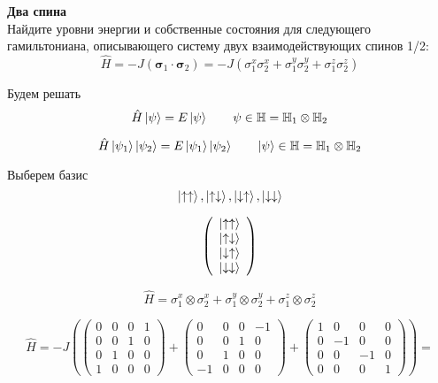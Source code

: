 \newpage

\begin{problem}{\textbf{Два спина}}
	\\
	Найдите уровни энергии и собственные состояния для следующего гамильтониана, описывающего систему двух взаимодействующих спинов 1/2:
	$$
	\hat{H}=-J\left(\boldsymbol{\sigma}_{1} \cdot \boldsymbol{\sigma}_{2}\right)=-J\left(\sigma_{1}^{x} \sigma_{2}^{x}+\sigma_{1}^{y} \sigma_{2}^{y}+\sigma_{1}^{z} \sigma_{2}^{z}\right)
	$$
	
\end{problem}	

\begin{solution}
 Будем решать $$ \hat{H}\ket{\psi}=E\ket{\psi } \qquad \psi \in \mathbb{H}=\mathbb{H}_1 \otimes \mathbb{H}_2 $$
 
 $$ \hat{H}\ket{\psi_1} \ket{\psi_2 }=E\ket{\psi_1} \ket{\psi_2} \qquad \ket{\psi } \in \mathbb{H}=\mathbb{H}_1 \otimes\mathbb{H}_2 $$
 
  
 Выберем базис
 $$
 \ket{\uparrow \uparrow},\ket{\uparrow \downarrow} ,\ket{\downarrow \uparrow} ,\ket{\downarrow \downarrow}
 $$
 
 $$
 \left(\begin{array}{l}\ket{\uparrow \uparrow} \\ \ket{\uparrow \downarrow} \\ \ket{\downarrow \uparrow} \\ \ket{\downarrow \downarrow} \end{array}\right)
 $$
 
 $$
 \hat{H} = \sigma^{x}_1 \otimes \sigma^{x}_{2} + \sigma^{y}_1 \otimes \sigma^{y}_{2} +  \sigma^{z}_1 \otimes \sigma^{z}_{2}
 $$
 
 $$ 
 \hat{H}=-J\left( \left(\begin{array}{llll}{0} & {0} & {0} & {1} \\ {0} & {0} & {1} & {0} \\ {0} & {1} & {0} & {0} \\ {1} & {0} & {0} & {0}\end{array}\right) + \left(\begin{array}{cccc}{0} & {0} & {0} & {-1} \\ {0} & {0} & {1} & {0} \\ {0} & {1} & {0} & {0} \\ {-1} & {0} & {0} & {0}\end{array}\right) + \left(\begin{array}{cccc}{1} & {0} & {0} & {0} \\ {0} & {-1} & {0} & {0} \\ {0} & {0} & {-1} & {0} \\ {0} & {0} & {0} & {1}\end{array}\right)\right)=$$
 

\end{solution}
